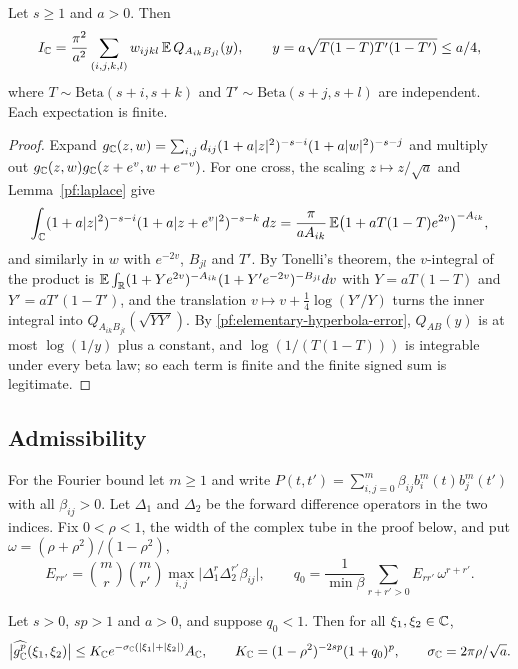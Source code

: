 \begin{lemma}\label{pf:pair-reduction}
Let $s\ge1$ and $a>0$. Then
\[
 I_\mathbb C=\frac{\pi^2}{a^2}\sum_{(i,j,k,l)}w_{ijkl}\,
 \mathbb E\,Q_{A_{ik}B_{jl}}(y),\qquad
 y=a\sqrt{T(1-T)T'(1-T')}\le a/4,
\]
where $T\sim\mathrm{Beta}(s+i,s+k)$ and $T'\sim\mathrm{Beta}(s+j,s+l)$
are independent. Each expectation is finite.
\end{lemma}

\begin{proof}
Expand $g_\mathbb C(z,w)=\sum_{i,j}d_{ij}(1+a|z|^2)^{-s-i}(1+a|w|^2)^{-s-j}$ and
multiply out $g_\mathbb C(z,w)g_\mathbb C(z+e^v,w+e^{-v})$. For one cross, the scaling
$z\mapsto z/\sqrt a$ and Lemma~\ref{pf:laplace} give
\[
 \int_\mathbb C(1+a|z|^2)^{-s-i}(1+a|z+e^v|^2)^{-s-k}\,dz
 =\frac\pi{aA_{ik}}\,\mathbb E\bigl(1+aT(1-T)e^{2v}\bigr)^{-A_{ik}},
\]
and similarly in $w$ with $e^{-2v}$, $B_{jl}$ and $T'$. By Tonelli's
theorem, the $v$-integral of the product is
$\mathbb E\int_\mathbb R(1+Ye^{2v})^{-A_{ik}}(1+Y'e^{-2v})^{-B_{jl}}dv$ with
$Y=aT(1-T)$ and $Y'=aT'(1-T')$, and the translation
$v\mapsto v+\frac14\log(Y'/Y)$ turns the inner integral into
$Q_{A_{ik}B_{jl}}(\sqrt{YY'})$. By
\eqref{pf:elementary-hyperbola-error}, $Q_{AB}(y)$ is at most
$\log(1/y)$ plus a constant, and $\log(1/(T(1-T)))$ is integrable under
every beta law; so each term is finite and the finite signed sum is
legitimate.
\end{proof}

\subsection{Admissibility}

For the Fourier bound let $m\ge1$ and write
$P(t,t')=\sum_{i,j=0}^m\beta_{ij}b_i^m(t)b_j^m(t')$ with all
$\beta_{ij}>0$. Let $\Delta_1$ and $\Delta_2$ be the forward difference
operators in the two indices. Fix $0<\rho<1$, the width of the complex
tube in the proof below, and put $\omega=(\rho+\rho^2)/(1-\rho^2)$,
\[
 E_{rr'}=\binom mr\binom m{r'}\max_{i,j}\bigl|\Delta_1^r\Delta_2^{r'}
 \beta_{ij}\bigr|,\qquad
 q_0=\frac1{\min\beta}\sum_{r+r'>0}E_{rr'}\,\omega^{r+r'} .
\]

\begin{lemma}\label{pf:tube}
Let $s>0$, $sp>1$ and $a>0$, and suppose $q_0<1$. Then for all
$\xi_1,\xi_2\in\mathbb C$,
\[
 \bigl|\widehat{g_\mathbb C^p}(\xi_1,\xi_2)\bigr|
 \le K_\mathbb C e^{-\sigma_\mathbb C(|\xi_1|+|\xi_2|)}A_\mathbb C,\qquad
 K_\mathbb C=(1-\rho^2)^{-2sp}(1+q_0)^p,\qquad
 \sigma_\mathbb C=2\pi\rho/\sqrt a .
\]
\end{lemma}

